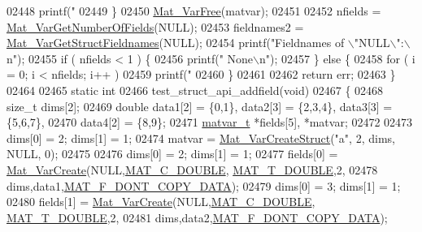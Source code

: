 \begin{DoxyCode}
{{{{{{02448             printf(\textcolor{stringliteral}{"  %
02449     \}
02450     \hyperlink{group___m_a_t_ga1d14716f7450530fd1c9d02413787f0e}{Mat\_VarFree}(matvar);
02451 
02452     nfields     = \hyperlink{group___m_a_t_ga06ba20aa758543d53dc83a1ccbdc2efc}{Mat\_VarGetNumberOfFields}(NULL);
02453     fieldnames2 = \hyperlink{group___m_a_t_ga88bc328e59ce1dd8f43e917c07140803}{Mat\_VarGetStructFieldnames}(NULL);
02454     printf(\textcolor{stringliteral}{"Fieldnames of \(\backslash\)"NULL\(\backslash\)":\(\backslash\)n"});
02455     \textcolor{keywordflow}{if} ( nfields < 1 ) \{
02456         printf(\textcolor{stringliteral}{"  None\(\backslash\)n"});
02457     \} \textcolor{keywordflow}{else} \{
02458         \textcolor{keywordflow}{for} ( i = 0; i < nfields; i++ )
02459             printf(\textcolor{stringliteral}{"  %
02460     \}
02461 
02462     \textcolor{keywordflow}{return} err;
02463 \}
02464 
02465 \textcolor{keyword}{static} \textcolor{keywordtype}{int}
02466 test\_struct\_api\_addfield(\textcolor{keywordtype}{void})
02467 \{
02468     \textcolor{keywordtype}{size\_t}    dims[2];
02469     \textcolor{keywordtype}{double}    data1[2] = \{0,1\}, data2[3] = \{2,3,4\}, data3[3] = \{5,6,7\},
02470               data4[2] = \{8,9\};
02471     \hyperlink{group___m_a_t_structmatvar__t}{matvar\_t} *fields[5], *matvar;
02472 
02473     dims[0] = 2; dims[1] = 1;
02474     matvar = \hyperlink{group___m_a_t_gacecdb682a50977e54ecbdc54ed5c31bf}{Mat\_VarCreateStruct}(\textcolor{stringliteral}{"a"}, 2, dims, NULL, 0);
02475 
02476     dims[0] = 2; dims[1] = 1;
02477     fields[0] = \hyperlink{group___m_a_t_ga1c54a84bb4d810c6fccdb8869489eac4}{Mat\_VarCreate}(NULL,\hyperlink{group___m_a_t_ggad4d60ae7b709fc81bfd744fb4c857c40a5d70e0862e5bdb7bd86bf7ba5948f307}{MAT\_C\_DOUBLE},
      \hyperlink{group___m_a_t_ggacf7b3b879282b7ab3a51190e49bf3453a31e721ecf7e188196f83c32838288797}{MAT\_T\_DOUBLE},2,
02478                               dims,data1,\hyperlink{group___m_a_t_ggab9d6ef9e3ddca78a317b173f01d53fbba762244499f52eb35e7b53fb79a1f2889}{MAT\_F\_DONT\_COPY\_DATA});
02479     dims[0] = 3; dims[1] = 1;
02480     fields[1] = \hyperlink{group___m_a_t_ga1c54a84bb4d810c6fccdb8869489eac4}{Mat\_VarCreate}(NULL,\hyperlink{group___m_a_t_ggad4d60ae7b709fc81bfd744fb4c857c40a5d70e0862e5bdb7bd86bf7ba5948f307}{MAT\_C\_DOUBLE},
      \hyperlink{group___m_a_t_ggacf7b3b879282b7ab3a51190e49bf3453a31e721ecf7e188196f83c32838288797}{MAT\_T\_DOUBLE},2,
02481                               dims,data2,\hyperlink{group___m_a_t_ggab9d6ef9e3ddca78a317b173f01d53fbba762244499f52eb35e7b53fb79a1f2889}{MAT\_F\_DONT\_COPY\_DATA});
}}}}}}}}
\end{DoxyCode}
